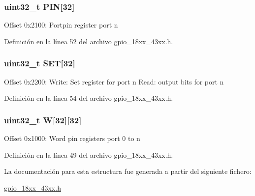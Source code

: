 \subsubsection[{\texorpdfstring{P\+IN}{PIN}}]{ uint32\+\_\+t P\+IN\mbox{[}32\mbox{]}}\hypertarget{struct_l_p_c___g_p_i_o___t_a2a7d9cae51250ad1c8b30cdb35f649ea}{}\label{struct_l_p_c___g_p_i_o___t_a2a7d9cae51250ad1c8b30cdb35f649ea}
Offset 0x2100\+: Portpin register port n 

Definición en la línea 52 del archivo gpio\+\_\+18xx\+\_\+43xx.\+h.

\subsubsection[{\texorpdfstring{S\+ET}{SET}}]{ uint32\+\_\+t S\+ET\mbox{[}32\mbox{]}}\hypertarget{struct_l_p_c___g_p_i_o___t_ada8d0d4ba2aa74d866a4c54da9c9fc49}{}\label{struct_l_p_c___g_p_i_o___t_ada8d0d4ba2aa74d866a4c54da9c9fc49}
Offset 0x2200\+: Write\+: Set register for port n Read\+: output bits for port n 

Definición en la línea 54 del archivo gpio\+\_\+18xx\+\_\+43xx.\+h.

\subsubsection[{\texorpdfstring{W}{W}}]{ uint32\+\_\+t W\mbox{[}32\mbox{]}\mbox{[}32\mbox{]}}\hypertarget{struct_l_p_c___g_p_i_o___t_a0aff9ee23a7a7a7b2fe413d40594b0fe}{}\label{struct_l_p_c___g_p_i_o___t_a0aff9ee23a7a7a7b2fe413d40594b0fe}
Offset 0x1000\+: Word pin registers port 0 to n 

Definición en la línea 49 del archivo gpio\+\_\+18xx\+\_\+43xx.\+h.



La documentación para esta estructura fue generada a partir del siguiente fichero\+:\begin{DoxyCompactItemize}
\item 
\hyperlink{gpio__18xx__43xx_8h}{gpio\+\_\+18xx\+\_\+43xx.\+h}\end{DoxyCompactItemize}
